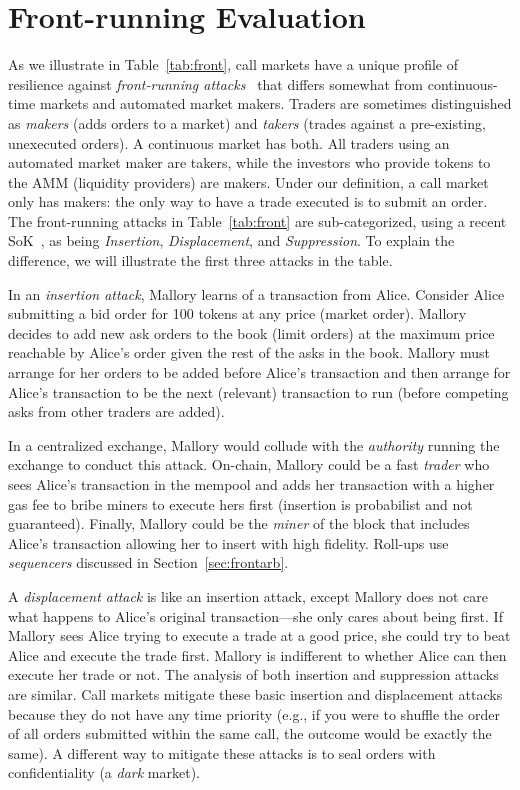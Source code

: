 \section{Front-running Evaluation} 
\label{sec:front}



As we illustrate in Table~\ref{tab:front}, call markets have a unique profile of resilience against \emph{front-running attacks}~\cite{clark2014decentralizing,eskandari2019sok,daian2019flash} that differs somewhat from continuous-time markets and automated market makers. Traders are sometimes distinguished as \emph{makers} (adds orders to a market) and \emph{takers} (trades against a pre-existing, unexecuted orders). A continuous market has both. All traders using an automated market maker are takers, while the investors who provide tokens to the AMM (liquidity providers) are makers. Under our definition, a call market only has makers: the only way to have a trade executed is to submit an order. The front-running attacks in Table~\ref{tab:front} are sub-categorized, using a recent SoK~\cite{eskandari2019sok}, as being \emph{Insertion}, \emph{Displacement}, and \emph{Suppression}. To explain the difference, we will illustrate the first three attacks in the table.

In an \emph{insertion attack}, Mallory learns of a transaction from Alice. Consider Alice submitting a bid order for 100 tokens at any price (market order). Mallory decides to add new ask orders to the book (limit orders) at the maximum price reachable by Alice's order given the rest of the asks in the book. Mallory must arrange for her orders to be added before Alice's transaction and then arrange for Alice's transaction to be the next (relevant) transaction to run (\eg before competing asks from other traders are added).

In a centralized exchange, Mallory would collude with the \emph{authority} running the exchange to conduct this attack. On-chain, Mallory could be a fast \emph{trader} who sees Alice's transaction in the mempool and adds her transaction with a higher gas fee to bribe miners to execute hers first (insertion is probabilist and not guaranteed). Finally, Mallory could be the \emph{miner} of the block that includes Alice's transaction allowing her to insert with high fidelity. Roll-ups use \emph{sequencers} discussed in Section~\ref{sec:frontarb}.

A \emph{displacement attack} is like an insertion attack, except Mallory does not care what happens to Alice's original transaction---she only cares about being first. If Mallory sees Alice trying to execute a trade at a good price, she could try to beat Alice and execute the trade first. Mallory is indifferent to whether Alice can then execute her trade or not. The analysis of both insertion and suppression attacks are similar.  Call markets mitigate these basic insertion and displacement attacks because they do not have any time priority (e.g., if you were to shuffle the order of all orders submitted within the same call, the outcome would be exactly the same). A different way to mitigate these attacks is to seal orders with confidentiality (a \textit{dark} market).

